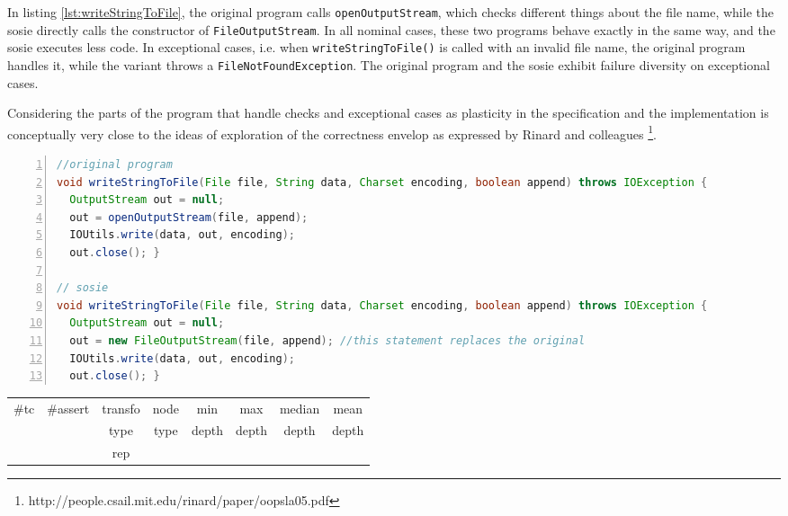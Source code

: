 In listing \ref{lst:writeStringToFile}, the original program calls \texttt{openOutputStream}, which checks different things about the file name, while the sosie  directly calls the constructor of \texttt{FileOutputStream}. 
In all nominal cases, these two programs behave exactly in the same way, and the sosie executes less code. 
In exceptional cases, i.e. when \texttt{writeStringToFile()} is called with an invalid file name, the original program handles it, while the variant throws a \texttt{FileNotFoundException}. 
The original program and the sosie exhibit failure diversity on exceptional cases.

Considering the parts of the program that handle checks and exceptional cases as plasticity in the specification and the implementation is conceptually very close to the ideas of exploration of the correctness envelop as expressed by Rinard and colleagues \footnote{http://people.csail.mit.edu/rinard/paper/oopsla05.pdf}.


\begin{minipage}{\columnwidth}
\begin{lstlisting}[caption={\texttt{writeStringToFile} in commons.io},label={lst:writeStringToFile},language=java,numbers=left]
//original program
void writeStringToFile(File file, String data, Charset encoding, boolean append) throws IOException {
  OutputStream out = null;
  out = openOutputStream(file, append); 
  IOUtils.write(data, out, encoding);
  out.close(); }

// sosie  
void writeStringToFile(File file, String data, Charset encoding, boolean append) throws IOException {
  OutputStream out = null;
  out = new FileOutputStream(file, append); //this statement replaces the original
  IOUtils.write(data, out, encoding);
  out.close(); }
\end{lstlisting}
\tabcolsep=0.11cm
\begin{tabular}{>{\small}c>{\small}c>{\small}c>{\small}c>{\small}c>{\small}c>{\small}c>{\small}c}
\hline
\rowcolor{lightgray} \#tc & \#assert & transfo & node & min & max & median & mean   \\
\rowcolor{lightgray}  & & type & type & depth  & depth & depth & depth  \\ 
\hline
 &  & rep &  &  &  &  & \\
\hline
\end{tabular}
\end{minipage}
